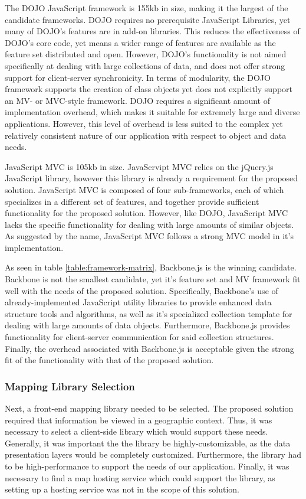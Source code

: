 \documentclass{report}
\begin{document}
The DOJO JavaScript framework is 155kb in size, making it the largest of the candidate frameworks. DOJO requires no prerequisite JavaScript Libraries, yet many of DOJO's features are in add-on libraries. This reduces the effectiveness of DOJO's core code, yet means a wider range of features are available as the feature set distributed and open. However, DOJO's functionality is not aimed specifically at dealing with large collections of data, and does not offer strong support for client-server synchronicity. In terms of modularity, the DOJO framework supports the creation of class objects yet does not explicitly support an MV- or MVC-style framework. DOJO requires a significant amount of implementation overhead, which makes it suitable for extremely large and diverse applications. However, this level of overhead is less suited to the complex yet relatively consistent nature of our application with respect to object and data needs.

JavaScript MVC is 105kb in size. JavaScrvipt MVC relies on the jQuery.js JavaScript library, however this library is already a requirement for the proposed solution. JavaScript MVC is composed of four sub-frameworks, each of which specializes in a different set of features, and together provide sufficient functionality for the proposed solution. However, like DOJO, JavaScript MVC lacks the specific functionality for dealing with large amounts of similar objects. As suggested by the name, JavaScript MVC follows a strong MVC model in it's implementation.

As seen in table \ref{table:framework-matrix}, Backbone.js is the winning candidate. Backbone is not the smallest candidate, yet it's feature set and MV framework fit well with the needs of the proposed solution. Specifically, Backbone's use of already-implemented JavaScript utility libraries to provide enhanced data structure tools and algorithms, as well as it's specialized collection template for dealing with large amounts of data objects. Furthermore, Backbone.js provides functionality for client-server communication for said collection structures. Finally, the overhead associated with Backbone.js is acceptable given the strong fit of the functionality with that of the proposed solution.

\subsubsection{Mapping Library Selection}

Next, a front-end mapping library needed to be selected. The proposed solution required that information be viewed in a geographic context. Thus, it was necessary to select a client-side library which would support these needs. Generally, it was important the the library be highly-customizable, as the data presentation layers would be completely customized. Furthermore, the library had to be high-performance to support the needs of our application. Finally, it was necessary to find a map hosting service which could support the library, as setting up a hosting service was not in the scope of this solution.
\end{document}
